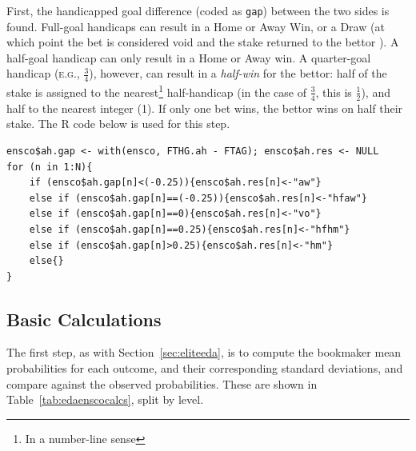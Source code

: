\documentclass[a4paper,10pt]{report}
\begin{document}
First, the handicapped goal difference (coded as \lstinline|gap|) between the two sides is found. Full-goal handicaps can result in a Home or Away Win, or a Draw (at which point the bet is considered void and the stake returned to the bettor \autocite{Bet365Markets}). A half-goal handicap can only result in a Home or Away win. A quarter-goal handicap (\textsc{e.g.}, $\frac{3}{4}$), however, can result in a \textit{half-win} for the bettor: half of the stake is assigned to the nearest\footnote{In a number-line sense} half-handicap (in the case of $\frac{3}{4}$, this is $\frac{1}{2}$), and half to the nearest integer (1). If only one bet wins, the bettor wins on half their stake. The R code below is used for this step.

\begin{lstlisting}
ensco$ah.gap <- with(ensco, FTHG.ah - FTAG); ensco$ah.res <- NULL
for (n in 1:N){
	if (ensco$ah.gap[n]<(-0.25)){ensco$ah.res[n]<-"aw"}
	else if (ensco$ah.gap[n]==(-0.25)){ensco$ah.res[n]<-"hfaw"}
	else if (ensco$ah.gap[n]==0){ensco$ah.res[n]<-"vo"}
	else if (ensco$ah.gap[n]==0.25){ensco$ah.res[n]<-"hfhm"}
	else if (ensco$ah.gap[n]>0.25){ensco$ah.res[n]<-"hm"}
	else{}
}
\end{lstlisting}

\subsection*{Basic Calculations}
The first step, as with Section~\ref{sec:eliteeda}, is to compute the bookmaker mean probabilities for each outcome, and their corresponding standard deviations, and compare against the observed probabilities. These are shown in Table~\ref{tab:edaenscocalcs}, split by level.
\end{document}
